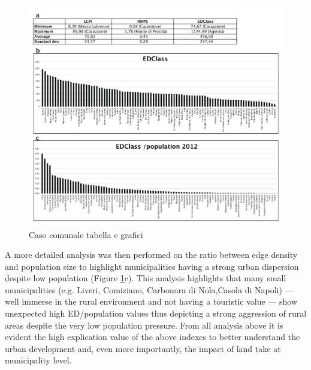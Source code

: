 \documentclass[APA,LATO1COL,doublespace]{WileyNJD-v2}
\begin{document}
\begin{figure}
    \centerline{
        \includegraphics[width=450pt]{daMileti/08_caso_comunale_tabella_grafici.pdf}
    }
    \caption{Caso comunale tabella e grafici}
    \label{fig:caseCOM_urbDev}
\end{figure}

A more detailed analysis was then performed on the ratio between edge density and population size to highlight municipalities having a strong urban dispersion despite low population (Figure \ref{fig:caseCOM_urbDev}c).
This analysis highlights that many small municipalities (e.g. Liveri, Comiziano, Carbonara di Nola,Casola di Napoli) --- well immerse in the rural environment and not having a touristic value --- show unexpected high ED/population values thus depicting a strong aggression of rural areas despite the very low population pressure.
From all analysis above it is evident the high explication value of the above indexes to better understand the urban development and, even more importantly, the impact of land take at municipality level.
\end{document}
